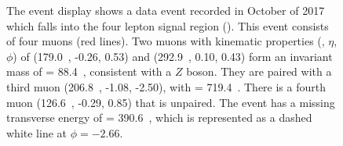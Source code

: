 \begin{figure}[h]
    \centering
    \caption[Event display for data event in the \SRFour signal region]{The event display shows a data event recorded in October of 2017 which falls into the four lepton signal region (\SRFour).
    This event consists of four muons (red lines). 
    Two muons with kinematic properties (\pt, $\eta$, $\phi$) of (179.0~\GeV, -0.26, 0.53) and (292.9~\GeV, 0.10, 0.43) form an invariant mass of \mll= 88.4~\GeV, consistent with a $Z$ boson.
    They are paired with a third muon (206.8~\GeV, -1.08, -2.50), with \mZl= 719.4~\GeV.
    There is a fourth muon (126.6~\GeV, -0.29, 0.85) that is unpaired.
    The event has a missing transverse energy of \met= 390.6~\GeV, which is represented as a dashed white line at $\phi=-2.66$. \cite{ATLAS:2020uer}}
    \label{fig:eventdisplaySR4l}
\end{figure}

